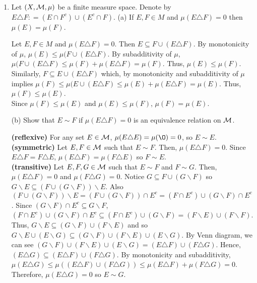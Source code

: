 \begin{enumerate}
\item Let $(X,{\mathcal M}, \mu)$ be a finite measure space. Denote by $E\triangle F \colon = (E \cap F^c)\cup (E^c \cap F)$.
\subitem(a) If $E, F \in M$ and $\mu(E\triangle F )=0$ then $\mu(E)=\mu(F)$.
\begin{pf}
Let $E, F \in M$ and $\mu(E\triangle F )=0$. Then $E \subseteq F \cup (E \triangle F)$. By monotonicity of $\mu$, $\mu(E) \leq \mu(F \cup (E \triangle F)$. By subadditivity of $\mu$, $\mu(F \cup (E \triangle F) \leq \mu(F) + \mu(E \triangle F) = \mu(F)$. Thus, $\mu(E) \leq \mu(F)$. \\
Similarly, $F \subseteq E \cup (E \triangle F)$ which, by monotonicity and subadditivity of $\mu$ implies $\mu(F) \leq \mu(E \cup (E \triangle F) \leq \mu(E) + \mu(E\triangle F) = \mu(E)$. Thus, $\mu(F) \leq \mu(E)$.\\
Since $\mu(F) \leq \mu(E)$ and $\mu(E) \leq \mu(F)$, $\mu(F) = \mu(E)$.
\end{pf}

\subitem(b) Show that $E \sim F$ if $\mu(E \triangle F)=0$ is an equivalence relation on ${\mathcal M}$. 

\begin{pf}
\textbf{(reflexive)} For any set $E \in {\mathcal M}$, $\mu(E \triangle E)= \mu(\O) = 0$, so $E \sim E$.
\\
\textbf{(symmetric)} Let $E, F \in {\mathcal M}$ such that $E \sim F$. Then, $\mu(E \triangle F) = 0$. Since $E \triangle F = F \triangle E$, $\mu(E \triangle F) = \mu(F \triangle E) $ so $F \sim E$. \\
\textbf{(transitive)}	Let $E, F, G \in {\mathcal M}$ such that $E \sim F$ and $F \sim G$. Then, $\mu(E \triangle F) = 0$ and $\mu(F \triangle G) = 0$.  Notice $G \subseteq F \cup (G \backslash F)$ so $G\backslash E \subseteq (F \cup (G \backslash F))\backslash E$. Also $(F \cup (G \backslash F))\backslash E = (F \cup (G \backslash F))\cap E^c= (F \cap E^c) \cup (G \backslash F)\cap E^c$. Since $(G \backslash F) \cap E^c \subseteq G \backslash F$, $(F \cap E^c) \cup (G \backslash F)\cap E^c \subseteq (F \cap E^c) \cup (G \backslash F)= (F \backslash E) \cup (F \backslash F)$. Thus, $G \backslash E \subseteq (G \backslash F) \cup (F \backslash E)$ and so $G \backslash E \cup (E \backslash G) \subseteq (G \backslash F) \cup (F \backslash E) \cup (E \backslash G)$. By Venn diagram, we can see $(G \backslash F) \cup (F \backslash E) \cup (E \backslash G) = (E \triangle F) \cup (F \triangle G)$. Hence, $(E \triangle G) \subseteq (E \triangle F) \cup (F \triangle G)$. By monotonicity and subadditivity, $\mu(E \triangle G) \leq \mu((E \triangle F) \cup (F \triangle G)) \leq \mu(E \triangle F) + \mu(F \triangle G)=0 $. Therefore,  $\mu(E \triangle G)=0$ so $E \sim G$. 
\end{pf}


\end{enumerate}
